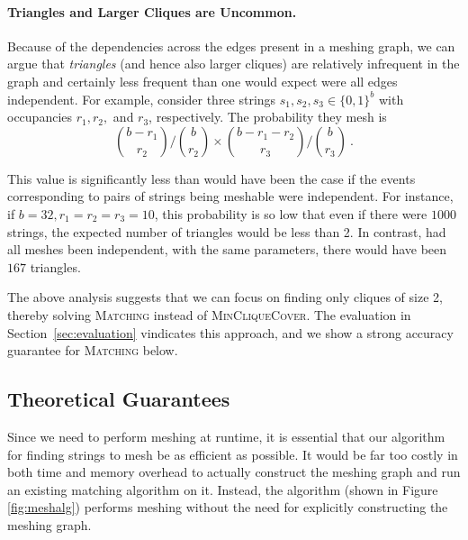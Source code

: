 \paragraph{Triangles and Larger Cliques are Uncommon.}
Because of the dependencies across the edges present in a meshing
graph, we can argue that \emph{triangles} (and hence also larger
cliques) are relatively infrequent in the graph and certainly less
frequent than one would expect were all edges independent.  For
example, consider three strings $s_1, s_2, s_3\in \{0,1\}^b$ with
occupancies $r_1, r_2,$ and $r_3$, respectively. The probability they
mesh is
\[
{\binom{b-r_1}{r_2}} \big / {\binom{b}{r_2}} \times {\binom{b-r_{1}-r_2 }{r_3}} \big / {\binom{b}{r_3}} \ . \]

This value is significantly less than would have been the case if the
events corresponding to pairs of strings being meshable were
independent.
For instance, if $b = 32, r_1=r_2=r_3 = 10$, this probability is so
low that even if there were $1000$ strings, the expected number of
triangles would be less than 2. In contrast, had all meshes been
independent, with the same parameters, there would have been $167$ triangles.

The above analysis suggests that we can focus on finding only cliques
of size 2, thereby solving \textsc{Matching} instead of
\textsc{MinCliqueCover}. The evaluation in
Section~\ref{sec:evaluation} vindicates this approach, and we show a
strong accuracy guarantee for \textsc{Matching} below.

\subsection{Theoretical Guarantees}
\label{subsec:analysis}
Since we need to perform meshing at runtime, it is essential that our
algorithm for finding strings to mesh be as efficient as possible. It
would be far too costly in both time and memory overhead to actually
construct the meshing graph and run an existing matching algorithm on
it. Instead, the \sm algorithm (shown in Figure \ref{fig:meshalg})
performs meshing without the need for explicitly constructing the
meshing graph.

